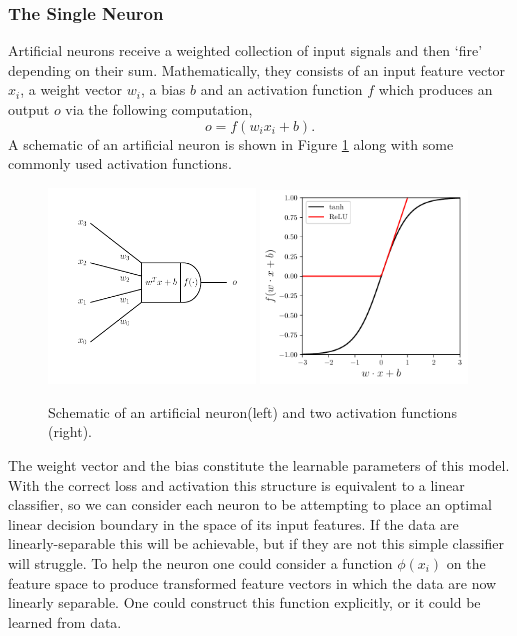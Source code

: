 \subsubsection{The Single Neuron}
Artificial neurons receive a weighted collection of input signals and then `fire' depending on their sum. Mathematically, they consists of an input feature vector $x_{i}$, a weight vector $w_{i}$, a bias $b$ and an activation function $f$ which produces an output $o$ via the following computation,
\begin{equation}
    o = f(w_{i}x_{i} + b).
\end{equation}
A schematic of an artificial neuron is shown in Figure \ref{fig:machine_learning:neuron_and_activation} along with some commonly used activation functions. 
\begin{figure}[h!]
    \begin{center}
        \includegraphics[width=0.49\textwidth]{figures/machine_learning/neuron.pdf}
        \includegraphics[width=0.49\textwidth]{figures/machine_learning/activation_functions.pdf}
    \end{center}
    \caption{Schematic of an artificial neuron(left) and two activation functions (right).}
        \label{fig:machine_learning:neuron_and_activation}
\end{figure}
The weight vector and the bias constitute the learnable parameters of this model. 
With the correct loss and activation this structure is equivalent to a linear classifier, so we can consider each neuron to be attempting to place an optimal linear decision boundary in the space of its input features. 
If the data are linearly-separable this will be achievable, but if they are not this simple classifier will struggle. 
To help the neuron one could consider a function $\phi(x_{i})$ on the feature space to produce transformed feature vectors in which the data are now linearly separable. 
One could construct this function explicitly, or it could be learned from data. 



